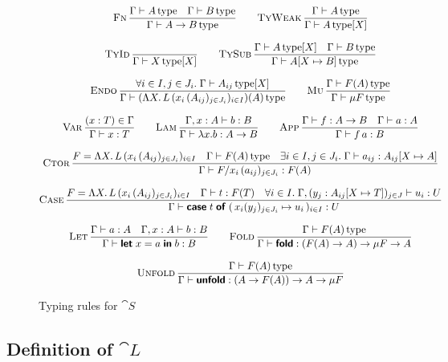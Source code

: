 \begin{figure}
  \begin{equation*}
    \setlength{\jot}{2.5ex}
    \begin{gathered}
      \infrule[Fn]{\Gamma \vdash \istype{A} \quad \Gamma \vdash \istype{B}}{\Gamma \vdash \istype{A \to B}} \qquad
      \infrule[TyWeak]{\Gamma \vdash \istype{A}}{\Gamma \vdash \istype{A}[X]} \\
      \infrule[TyId]{}{\Gamma \vdash \istype{X}[X]} \qquad
      \infrule[TySub]{\Gamma \vdash \istype{A}[X] \quad \Gamma \vdash \istype{B}}{\Gamma \vdash \istype{A[X \mapsto B]}} \\
      \infrule[Endo]{
        \forall i \in I,j \in J_i. \; \Gamma \vdash \istype{A_{ij}}[X]
      }{\Gamma \vdash \istype{(\Lambda X .\, L\,  (x_i \, (A_{ij})_{j \in J_i})_{i \in I})(A)}} \qquad
      \infrule[Mu]{
        \Gamma \vdash \istype{F(A)}
      }{\Gamma \vdash \istype{\mu F}} \\
      \infrule[Var]{(x : T) \in \Gamma}{\Gamma \vdash x : T} \qquad
      \infrule[Lam]{\Gamma, x : A \vdash b : B}{\Gamma \vdash \lambda x . b : A \to B} \qquad
      \infrule[App]{\Gamma \vdash f : A \to B \quad \Gamma \vdash a : A}{\Gamma \vdash f\,a : B} \\
      \infrule[Ctor]{F = \Lambda X .\, L\, (x_i \, (A_{ij})_{j \in J_i})_{i \in I} \quad \Gamma \vdash \istype{F(A)} \quad
        \exists i \in I, j \in J_i . \; \Gamma \vdash a_{ij} : A_{ij}[X \mapsto A]}
      {\Gamma \vdash F / x_i \, (a_{ij})_{j \in J_i} : F(A)} \\
      \infrule[Case]{F = \Lambda X .\, L\,  (x_i \, (A_{ij})_{j \in J_i})_{i \in I} \quad \Gamma \vdash t : F (T) \quad \forall i \in I . \; \Gamma , (y_j : A_{ij}[X \mapsto T])_{j \in J} \vdash u_i : U}
      {\Gamma \vdash \caseof{t}\; (\,\case{x_i (y_j)_{j \in J_i}}{u_i}\,)_{i \in I} : U} \\
      \infrule[Let]{\Gamma \vdash a : A \quad \Gamma, x : A \vdash b : B}{\Gamma \vdash \letin{x}{a}{b} : B} \qquad
      \infrule[Fold]{\Gamma \vdash \istype{F(A)}}{\Gamma \vdash \inte{fold} : (F(A) \to A) \to \mu F \to A} \\
      \infrule[Unfold]{\Gamma \vdash \istype{F(A)}}{\Gamma \vdash \inte{unfold} : (A \to F(A)) \to A \to \mu F}
    \end{gathered}
  \end{equation*}
  \caption{Typing rules for $\cat S$}
\end{figure}

\subsection{Definition of $\cat L$}

